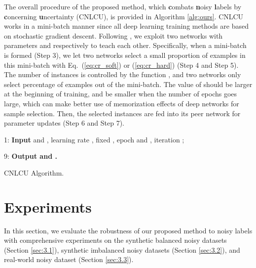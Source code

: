 \documentclass[11pt]{article}
\begin{document}
The overall procedure of the proposed method, which \textbf{c}ombats \textbf{n}oisy \textbf{l}abels by \textbf{c}oncerning \textbf{u}ncertainty (CNLCU), is provided in Algorithm \ref{alg:ours}. CNLCU works in a mini-batch manner since all deep learning training methods are based on stochastic gradient descent. Following \citep{han2018co}, we exploit two networks with parameters  and  respectively to teach each other. Specifically, when a mini-batch  is formed (Step 3), we let two networks select a small proportion of examples in this mini-batch with Eq.~(\ref{eq:cr_soft}) or (\ref{eq:cr_hard}) (Step 4 and Step 5). The number of instances is controlled by the function , and two networks only select  percentage of examples out of the mini-batch. The value of  should be larger at the beginning of training, and be smaller when the number of epochs goes large, which can make better use of memorization effects of deep networks \citep{han2018co} for sample selection. Then, the selected instances are fed into its peer network for parameter updates (Step 6 and Step 7). 
\vspace{-5pt}
\begin{algorithm}[!t]
1: {\bfseries Input}  and , learning rate , fixed , epoch  and , iteration ;


9: {\bfseries Output  and .}
\caption{CNLCU Algorithm.}
\label{alg:ours}
\end{algorithm}
\vspace{-5pt}
\section{Experiments}\label{sec:3}
In this section, we evaluate the robustness of our proposed method to noisy labels with comprehensive experiments on the synthetic balanced noisy datasets (Section \ref{sec:3.1}), synthetic imbalanced noisy datasets (Section \ref{sec:3.2}), and real-world noisy dataset (Section \ref{sec:3.3}).
\end{document}
